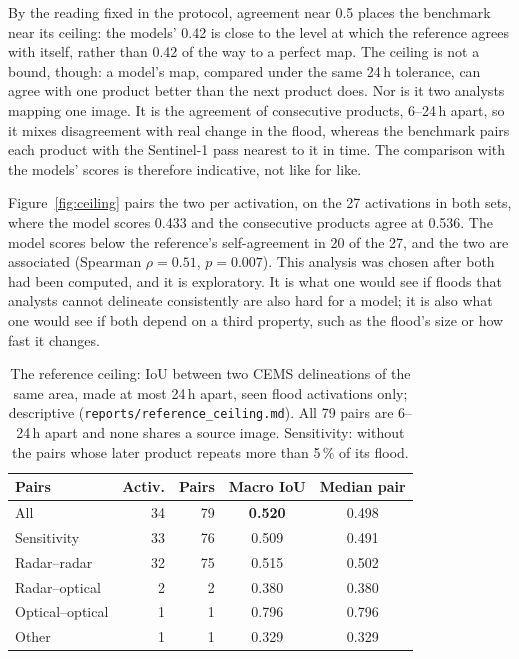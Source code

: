 \documentclass[10pt,twocolumn,a4paper]{article}
\newcommand{\file}[1]{\nolinkurl{#1}}
\newcommand{\pp}{\,\%}
\begin{document}
By the reading fixed in the protocol, agreement near 0.5 places the benchmark near its ceiling: the models' 0.42 is
close to the level at which the reference agrees with itself, rather than 0.42 of the way to a perfect map. The
ceiling is not a bound, though: a model's map, compared under the same 24\,h tolerance, can agree with one product
better than the next product does. Nor is it two analysts mapping one image. It is the agreement of consecutive
products, 6--24\,h apart, so it mixes disagreement with real change in the flood, whereas the benchmark pairs each
product with the Sentinel-1 pass nearest to it in time. The comparison with the models' scores is therefore
indicative, not like for like.

Figure~\ref{fig:ceiling} pairs the two per activation, on the 27 activations in both sets, where the model scores
0.433 and the consecutive products agree at 0.536. The model scores below the reference's self-agreement in 20 of
the 27, and the two are associated (Spearman $\rho = 0.51$, $p = 0.007$). This analysis was chosen after both had
been computed, and it is exploratory. It is what one would see if floods that analysts cannot delineate consistently
are also hard for a model; it is also what one would see if both depend on a third property, such as the flood's
size or how fast it changes.

\begin{table}[t]
\centering\small
\caption{The reference ceiling: IoU between two CEMS delineations of the same area, made at most 24\,h apart, seen
flood activations only; descriptive (\file{reports/reference_ceiling.md}). All 79 pairs are 6--24\,h apart and none
shares a source image. Sensitivity: without the pairs whose later product repeats more than 5\pp{} of its flood.}
\label{tab:ceiling}
\setlength{\tabcolsep}{3.5pt}
\begin{tabular}{@{}l r r c c@{}}
\toprule
Pairs & Activ. & Pairs & Macro IoU & Median pair \\
\midrule
All & 34 & 79 & \textbf{0.520} & 0.498 \\
Sensitivity & 33 & 76 & 0.509 & 0.491 \\
\midrule
Radar--radar & 32 & 75 & 0.515 & 0.502 \\
Radar--optical & 2 & 2 & 0.380 & 0.380 \\
Optical--optical & 1 & 1 & 0.796 & 0.796 \\
Other & 1 & 1 & 0.329 & 0.329 \\
\bottomrule
\end{tabular}
\end{table}
\end{document}
